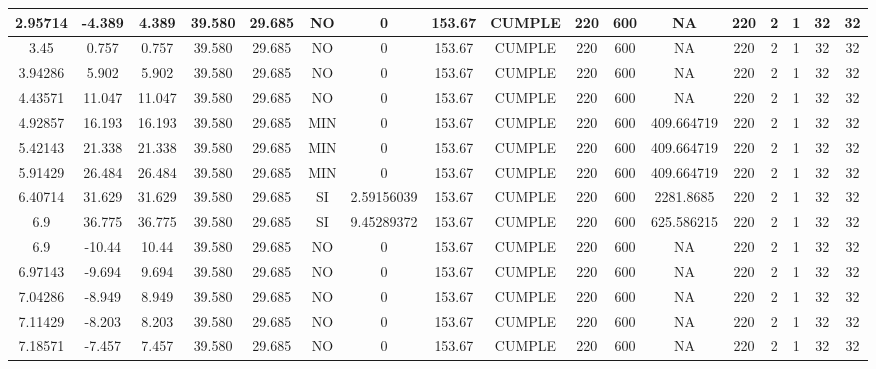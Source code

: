 \begin{table}[H]
{\begin{tabular}{|c|c|c|c|c|c|c|c|c|c|c|c|c|c|c|c|c|}
    \hline
    2.95714 & -4.389 & 4.389 & 39.580 & 29.685 & NO  & 0   & 153.67 & CUMPLE & 220 & 600 & NA  & 220 & 2   & 1   & 32  & 32 \bigstrut\\
    \hline
    3.45 & 0.757 & 0.757 & 39.580 & 29.685 & NO  & 0   & 153.67 & CUMPLE & 220 & 600 & NA  & 220 & 2   & 1   & 32  & 32 \bigstrut\\
    \hline
    3.94286 & 5.902 & 5.902 & 39.580 & 29.685 & NO  & 0   & 153.67 & CUMPLE & 220 & 600 & NA  & 220 & 2   & 1   & 32  & 32 \bigstrut\\
    \hline
    4.43571 & 11.047 & 11.047 & 39.580 & 29.685 & NO  & 0   & 153.67 & CUMPLE & 220 & 600 & NA  & 220 & 2   & 1   & 32  & 32 \bigstrut\\
    \hline
    4.92857 & 16.193 & 16.193 & 39.580 & 29.685 & MIN & 0   & 153.67 & CUMPLE & 220 & 600 & 409.664719 & 220 & 2   & 1   & 32  & 32 \bigstrut\\
    \hline
    5.42143 & 21.338 & 21.338 & 39.580 & 29.685 & MIN & 0   & 153.67 & CUMPLE & 220 & 600 & 409.664719 & 220 & 2   & 1   & 32  & 32 \bigstrut\\
    \hline
    5.91429 & 26.484 & 26.484 & 39.580 & 29.685 & MIN & 0   & 153.67 & CUMPLE & 220 & 600 & 409.664719 & 220 & 2   & 1   & 32  & 32 \bigstrut\\
    \hline
    6.40714 & 31.629 & 31.629 & 39.580 & 29.685 & SI  & 2.59156039 & 153.67 & CUMPLE & 220 & 600 & 2281.8685 & 220 & 2   & 1   & 32  & 32 \bigstrut\\
    \hline
    6.9 & 36.775 & 36.775 & 39.580 & 29.685 & SI  & 9.45289372 & 153.67 & CUMPLE & 220 & 600 & 625.586215 & 220 & 2   & 1   & 32  & 32 \bigstrut\\
    \hline
    6.9 & -10.44 & 10.44 & 39.580 & 29.685 & NO  & 0   & 153.67 & CUMPLE & 220 & 600 & NA  & 220 & 2   & 1   & 32  & 32 \bigstrut\\
    \hline
    6.97143 & -9.694 & 9.694 & 39.580 & 29.685 & NO  & 0   & 153.67 & CUMPLE & 220 & 600 & NA  & 220 & 2   & 1   & 32  & 32 \bigstrut\\
    \hline
    7.04286 & -8.949 & 8.949 & 39.580 & 29.685 & NO  & 0   & 153.67 & CUMPLE & 220 & 600 & NA  & 220 & 2   & 1   & 32  & 32 \bigstrut\\
    \hline
    7.11429 & -8.203 & 8.203 & 39.580 & 29.685 & NO  & 0   & 153.67 & CUMPLE & 220 & 600 & NA  & 220 & 2   & 1   & 32  & 32 \bigstrut\\
    \hline
    7.18571 & -7.457 & 7.457 & 39.580 & 29.685 & NO  & 0   & 153.67 & CUMPLE & 220 & 600 & NA  & 220 & 2   & 1   & 32  & 32 \bigstrut\\

\end{tabular}}
\end{table}
